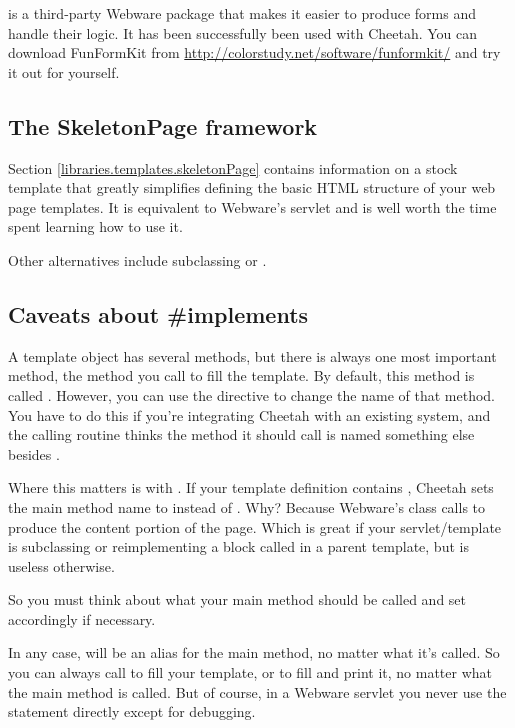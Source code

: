  is a third-party Webware package that makes it easier to
produce forms and handle their logic.  It has been successfully been used with
Cheetah.  You can download FunFormKit from
\url{http://colorstudy.net/software/funformkit/} and try it out for yourself.


\subsection{The SkeletonPage framework}
\label{webware.skeletonPage}

Section \ref{libraries.templates.skeletonPage} contains information on a stock
template that greatly simplifies defining the basic HTML structure of your web
page templates.  It is equivalent to Webware's  servlet and
is well worth the time spent learning how to use it.

Other alternatives include subclassing  or
.  


\subsection{Caveats about \#implements}
\label{webware.implements}

A template object has several methods, but there is always one most important
method, the method you call to fill the template.  By default, this method is
called .  However, you can use the 
directive to change the name of that method.  You have to do this if you're
integrating Cheetah with an existing system, and the calling routine thinks the
method it should call is named something else besides .

Where this matters is with .  If your template definition 
contains , Cheetah sets the main method name to 
 instead of .  Why?  Because Webware's
 class calls  to produce the content 
portion of the page.  Which is great if your servlet/template is subclassing
 or reimplementing a block called  in a
parent template, but is useless otherwise.

So you must think about what your main method should be called and set
 accordingly if necessary.


In any case,  will be an alias for the main method, no
matter what it's called.  So you can always call  to fill your
template, or  to fill and print it, no matter what the main
method is called.  But of course, in a Webware servlet you never use the
 statement directly except for debugging.

